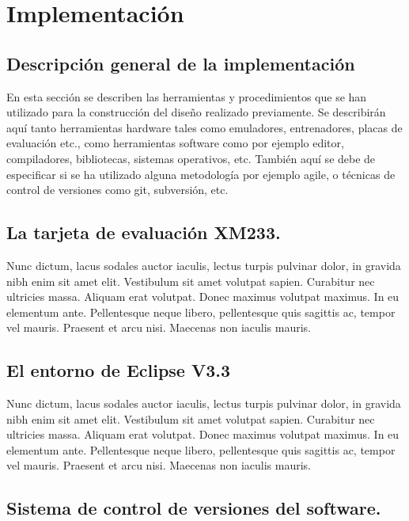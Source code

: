 \chapter{Implementación}
\label{cap5}

\section{Descripción general de la implementación}

En esta sección se describen las herramientas y procedimientos que se han
utilizado para la construcción del diseño realizado previamente. Se describirán
aquí tanto herramientas hardware tales como emuladores, entrenadores, placas de
evaluación etc., como herramientas software como por ejemplo editor,
compiladores, bibliotecas, sistemas operativos, etc. También aquí se debe de
especificar si se ha utilizado alguna metodología por ejemplo agile, o técnicas
de control de versiones como git, subversión, etc.


\section{La tarjeta de evaluación XM233.}

Nunc dictum, lacus sodales auctor iaculis, lectus turpis pulvinar dolor, in
gravida nibh enim sit amet elit. Vestibulum sit amet volutpat sapien. Curabitur
nec ultricies massa. Aliquam erat volutpat. Donec maximus volutpat maximus. In
eu elementum ante. Pellentesque neque libero, pellentesque quis sagittis ac,
tempor vel mauris. Praesent et arcu nisi. Maecenas non iaculis mauris.

\section{El entorno de Eclipse V3.3}

Nunc dictum, lacus sodales auctor iaculis, lectus turpis pulvinar dolor, in
gravida nibh enim sit amet elit. Vestibulum sit amet volutpat sapien. Curabitur
nec ultricies massa. Aliquam erat volutpat. Donec maximus volutpat maximus. In
eu elementum ante. Pellentesque neque libero, pellentesque quis sagittis ac,
tempor vel mauris. Praesent et arcu nisi. Maecenas non iaculis mauris.

\section{Sistema de control de versiones del software.}

